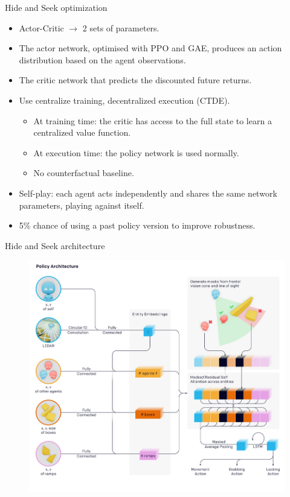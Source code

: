 \documentclass[9pt, hyperref={pdfusetitle,colorlinks=true,allcolors=DarkBlue}]{beamer}
\begin{document}
\begin{frame}{Hide and Seek optimization}
    \begin{itemize}
        \item Actor-Critic $\rightarrow$ 2 sets of parameters.
        \item The actor network, optimised with PPO and GAE, produces an action distribution based on the agent observations.
        \item The critic network that predicts the discounted future returns.
        \item Use centralize training, decentralized execution (CTDE).
        \begin{itemize}
            \item At training time: the critic has access to the full state to learn a centralized value function.
            \item At execution time: the policy network is used normally.
            \item No counterfactual baseline.
        \end{itemize}{}
        \item Self-play: each agent acts independently and shares the same network parameters, playing against itself.
        \item 5\% chance of using a past policy version to improve robustness.
    \end{itemize}{}
\end{frame}{}

\begin{frame}{Hide and Seek architecture}
    \begin{figure}
    \centering
    \includegraphics[scale=0.25]{hasarch.png}
    \end{figure}
\end{frame}{}
\end{document}
